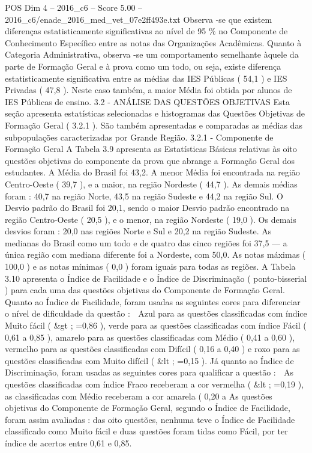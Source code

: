 \begin{textsample}{POS Dim 4 – 2016\_c6 – Score 5.00 – 2016\_c6/enade\_2016\_med\_vet\_07e2ff493e.txt}
Observa -se que existem diferenças estatisticamente significativas ao nível de 95 \% no Componente de Conhecimento Específico entre as notas das Organizações Acadêmicas.
Quanto à Categoria Administrativa, observa -se um comportamento semelhante àquele da parte de Formação Geral e à prova como um todo, ou seja, existe diferença estatisticamente significativa entre as médias das IES Públicas ( 54,1 ) e IES Privadas ( 47,8 ).
Neste caso também, a maior Média foi obtida por alunos de IES Públicas de ensino. 3.2 - ANÁLISE DAS QUESTÕES OBJETIVAS Esta seção apresenta estatísticas selecionadas e histogramas das Questões Objetivas de Formação Geral ( 3.2.1 ).
São também apresentadas e comparadas as médias das subpopulações caracterizadas por Grande Região. 3.2.1 - Componente de Formação Geral A Tabela 3.9 apresenta as Estatísticas Básicas relativas às oito questões objetivas do componente da prova que abrange a Formação Geral dos estudantes.
A Média do Brasil foi 43,2.
A menor Média foi encontrada na região Centro-Oeste ( 39,7 ), e a maior, na região Nordeste ( 44,7 ).
As demais médias foram : 40,7 na região Norte, 43,5 na região Sudeste e 44,2 na região Sul.
O Desvio padrão do Brasil foi 20,1, sendo o maior Desvio padrão encontrado na região Centro-Oeste ( 20,5 ), e o menor, na região Nordeste ( 19,0 ).
Os demais desvios foram : 20,0 nas regiões Norte e Sul e 20,2 na região Sudeste.
As medianas do Brasil como um todo e de quatro das cinco regiões foi 37,5 — a única região com mediana diferente foi a Nordeste, com 50,0.
As notas máximas ( 100,0 ) e as notas mínimas ( 0,0 ) foram iguais para todas as regiões.
A Tabela 3.10 apresenta o Índice de Facilidade e o Índice de Discriminação ( ponto-bisserial ) para cada uma das questões objetivas do Componente de Formação Geral.
Quanto ao Índice de Facilidade, foram usadas as seguintes cores para diferenciar o nível de dificuldade da questão :  Azul para as questões classificadas com índice Muito fácil ( \&gt ; =0,86 ), verde para as questões classificadas com índice Fácil ( 0,61 a 0,85 ), amarelo para as questões classificadas com Médio ( 0,41 a 0,60 ), vermelho para as questões classificadas com Difícil ( 0,16 a 0,40 ) e roxo para as questões classificadas com Muito difícil ( \&lt ; =0,15 ).
Já quanto ao Índice de Discriminação, foram usadas as seguintes cores para qualificar a questão :  As questões classificadas com índice Fraco receberam a cor vermelha ( \&lt ; =0,19 ), as classificadas com Médio receberam a cor amarela ( 0,20 a As questões objetivas do Componente de Formação Geral, segundo o Índice de Facilidade, foram assim avaliadas : das oito questões, nenhuma teve o Índice de Facilidade classificado como Muito fácil e duas questões foram tidas como Fácil, por ter índice de acertos entre 0,61 e 0,85.

\end{textsample}
